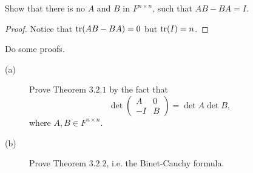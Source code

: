 \begin{pro}%
	Show that there is no $A$ and $B$ in $F^{n\times n}$, such that $AB-BA=I$.
\end{pro}
\begin{proof}
	Notice that $\operatorname*{tr}(AB-BA)=0$ but $\operatorname*{tr}(I)=n$.
\end{proof}

\begin{pro}%
	Do some proofs.
	\begin{description}
		\item[(a)] Prove Theorem $3.2.1$ by the fact that
		\[\det\begin{pmatrix}A&0\\-I&B\end{pmatrix}=\det A \det B,\]
		where $A,B\in F^{n\times n}$.
		\item[(b)] Prove Theorem $3.2.2$, i.e. the Binet-Cauchy formula.
	\end{description}
\end{pro}
